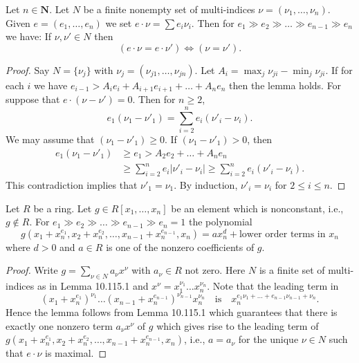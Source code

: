 
\begin{lemma}[10.115.1, Tag 051M]
Let $n\in\mathbf N$. Let $N$ be a finite nonempty set of multi-indices $\nu=(\nu_1,\ldots,\nu_n)$. Given $e=(e_1,\ldots,e_n)$ we set $e\cdot\nu=\sum e_i\nu_i$. Then for $e_1\gg e_2\gg\ldots\gg e_{n-1}\gg e_n$ we have: If $\nu,\nu'\in N$ then
\[
(e\cdot\nu=e\cdot\nu')\Longleftrightarrow(\nu=\nu').
\]
\end{lemma}
\begin{proof}
Say $N=\{\nu_j\}$ with $\nu_j=(\nu_{j1},\ldots,\nu_{jn})$. Let $A_i=\max_j\nu_{ji}-\min_j\nu_{ji}$. If for each $i$ we have $e_{i-1}>A_ie_i+A_{i+1}e_{i+1}+\ldots+A_ne_n$ then the lemma holds. For suppose that $e\cdot(\nu-\nu')=0$. Then for $n\geq2$,
\[
e_1(\nu_1-\nu'_1)=\sum_{i=2}^n e_i(\nu'_i-\nu_i).
\]
We may assume that $(\nu_1-\nu'_1)\geq0$. If $(\nu_1-\nu'_1)>0$, then
\begin{align*}
e_1(\nu_1-\nu'_1)&\geq e_1>A_2e_2+\ldots+A_ne_n\\
&\geq\sum_{i=2}^n e_i|\nu'_i-\nu_i|\geq\sum_{i=2}^n e_i(\nu'_i-\nu_i).
\end{align*}
This contradiction implies that $\nu'_1=\nu_1$. By induction, $\nu'_i=\nu_i$ for $2\leq i\leq n$.
\end{proof}
\begin{lemma}[10.115.2, Tag 051N]
Let $R$ be a ring. Let $g\in R[x_1,\ldots,x_n]$ be an element which is nonconstant, i.e., $g\notin R$. For $e_1\gg e_2\gg\ldots\gg e_{n-1}\gg e_n=1$ the polynomial
\[
g(x_1+x_n^{e_1},x_2+x_n^{e_2},\ldots,x_{n-1}+x_n^{e_{n-1}},x_n)
=ax_n^d+\text{lower order terms in }x_n
\]
where $d>0$ and $a\in R$ is one of the nonzero coefficients of $g$.
\end{lemma}
\begin{proof}
Write $g=\sum_{\nu\in N}a_\nu x^\nu$ with $a_\nu\in R$ not zero. Here $N$ is a finite set of multi-indices as in Lemma 10.115.1 and $x^\nu=x_1^{\nu_1}\ldots x_n^{\nu_n}$. Note that the leading term in
\[
(x_1+x_n^{e_1})^{\nu_1}\ldots(x_{n-1}+x_n^{e_{n-1}})^{\nu_{n-1}}x_n^{\nu_n}
\quad\text{is}\quad x_n^{e_1\nu_1+\ldots+e_{n-1}\nu_{n-1}+\nu_n}.
\]
Hence the lemma follows from Lemma 10.115.1 which guarantees that there is exactly one nonzero term $a_\nu x^\nu$ of $g$ which gives rise to the leading term of $g(x_1+x_n^{e_1},x_2+x_n^{e_2},\ldots,x_{n-1}+x_n^{e_{n-1}},x_n)$, i.e., $a=a_\nu$ for the unique $\nu\in N$ such that $e\cdot\nu$ is maximal.
\end{proof}
